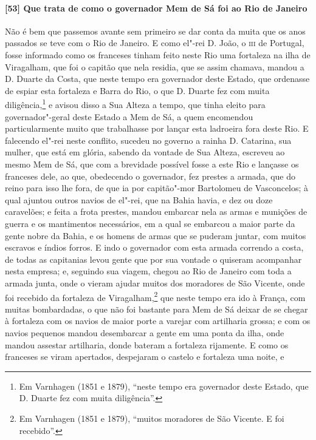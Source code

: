 \paragraph{[53] Que trata de como o governador Mem de Sá foi ao Rio de Janeiro} \quad
Não é bem que passemos avante sem primeiro se dar conta da muita que os anos passados se
teve com o Rio de Janeiro. E como el"-rei D. João, o \textsc{iii} de Portugal, fosse
informado como os franceses tinham feito neste Rio uma fortaleza na ilha de Viragalham,
que foi o capitão que nela residia, que se assim chamava, mandou a D. Duarte da Costa, que
neste tempo era governador deste Estado, que ordenasse de espiar esta fortaleza e Barra do
Rio, o que D. Duarte fez com muita diligência,\footnote{ Em Varnhagen (1851 e 1879),
``neste tempo era governador deste Estado, que D. Duarte fez com muita diligência''.} e
avisou disso a Sua Alteza a tempo, que tinha eleito para governador"-geral deste Estado a
Mem de Sá, a quem encomendou particularmente muito que trabalhasse por lançar esta
ladroeira fora deste Rio. E falecendo el"-rei neste conflito, sucedeu no governo a rainha
D. Catarina, sua mulher, que está em glória, sabendo da vontade de Sua Alteza, escreveu ao
mesmo Mem de Sá, que com a brevidade possível fosse a este Rio e lançasse os franceses
dele, ao que, obedecendo o governador, fez prestes a armada, que do reino para isso lhe
fora, de que ia por capitão"-mor Bartolomeu de Vasconcelos; à qual ajuntou outros navios de
el"-rei, que na Bahia havia, e dez ou doze caravelões; e feita a frota prestes, mandou
embarcar nela as armas e munições de guerra e os mantimentos necessários, em a qual se
embarcou a maior parte da gente nobre da Bahia, e os homens de armas que se puderam
juntar, com muitos escravos e índios forros. E indo o governador com esta armada correndo
a costa, de todas as capitanias levou gente que por sua vontade o quiseram acompanhar
nesta empresa; e, seguindo sua viagem, chegou ao Rio de Janeiro com toda a armada junta,
onde o vieram ajudar muitos dos moradores de São Vicente, onde foi recebido da fortaleza
de Viragalham,\footnote{ Em Varnhagen (1851 e 1879), ``muitos moradores de São Vicente. E
foi recebido''.} que neste tempo era ido à França, com muitas bombardadas, o que não foi
bastante para Mem de Sá deixar de se chegar à fortaleza com os navios de maior porte a
varejar com artilharia grossa; e com os navios pequenos mandou desembarcar a gente em uma
ponta da ilha, onde mandou assestar artilharia, donde bateram a fortaleza rijamente. E
como os franceses se viram apertados, despejaram o castelo e fortaleza uma noite, e

